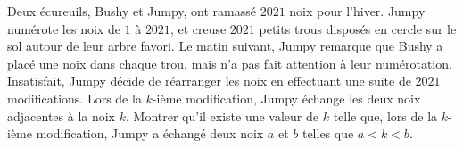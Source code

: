 Deux écureuils, Bushy et Jumpy, ont ramassé $2021$ noix pour l'hiver. Jumpy numérote les noix de $1$ à $2021$,
et creuse $2021$ petits trous disposés en cercle sur le sol autour de leur arbre favori. Le matin suivant,
Jumpy remarque que Bushy a placé une noix dans chaque trou, mais n'a pas fait attention à leur numérotation.
Insatisfait, Jumpy décide de réarranger les noix en effectuant une suite de $2021$ modifications. Lors de la
$k$-ième modification, Jumpy échange les deux noix adjacentes à la noix $k$. Montrer qu'il existe une valeur
de $k$ telle que, lors de la $k$-ième modification, Jumpy a échangé deux noix $a$ et $b$ telles que $a < k < b$.
